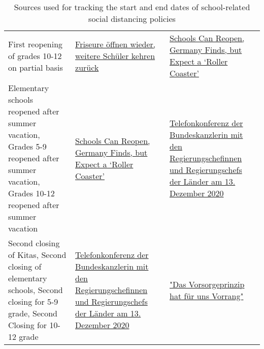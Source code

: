 \begin{table}[hbt!]
{\begin{tabular}{|| L | L | L ||}
First reopening of grades 10-12 on partial basis & \href{https://www.bundesregierung.de/breg-de/suche/weitere-oeffnungen-1750154}{Friseure öffnen wieder, weitere Schüler kehren zurück} & \href{https://www.nytimes.com/2020/08/26/world/europe/germany-schools-virus-reopening.html}{Schools Can Reopen, Germany Finds, but Expect a ‘Roller Coaster’} \\


Elementary schools reopened after summer vacation, Grades 5-9 reopened after summer vacation, Grades 10-12 reopened after summer vacation  & \href{https://www.nytimes.com/2020/08/26/world/europe/germany-schools-virus-reopening.html}{Schools Can Reopen, Germany Finds, but Expect a ‘Roller Coaster’} & \href{https://www.bundesregierung.de/breg-de/suche/telefonkonferenz-der-bundeskanzlerin-mit-den-regierungschefinnen-und-regierungschefs-der-laender-am-13-dezember-2020-1827392}{Telefonkonferenz der Bundeskanzlerin mit den Regierungschefinnen und Regierungschefs der Länder am 13. Dezember 2020} \\

 Second closing of Kitas, Second closing of elementary schools, Second closing for 5-9 grade, Second Closing for 10-12 grade & \href{https://www.bundesregierung.de/breg-de/suche/telefonkonferenz-der-bundeskanzlerin-mit-den-regierungschefinnen-und-regierungschefs-der-laender-am-13-dezember-2020-1827392}{Telefonkonferenz der Bundeskanzlerin mit den Regierungschefinnen und Regierungschefs der Länder am 13. Dezember 2020} & \href{https://www.bundesregierung.de/breg-de/suche/bund-laender-beschluss-1841048}{"Das Vorsorgeprinzip hat für uns Vorrang"} \\[1ex]
 \hline
 \end{tabular}
 }
 \caption{Sources used for tracking the start and end dates of school-related social distancing policies}
\label{table:2}
\end{table}
